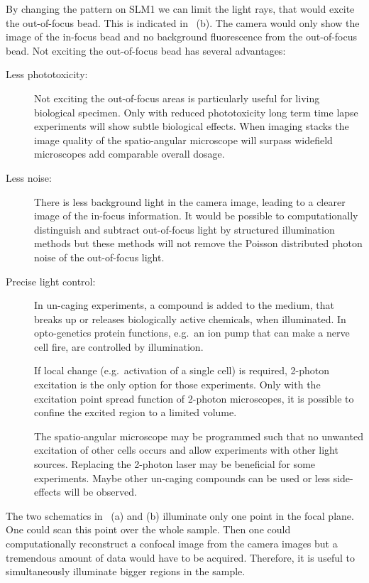 By changing the pattern on SLM1 we can limit the light rays, that
would excite the out-of-focus bead. This is indicated in
~(b). The camera would only show the image
of the in-focus bead and no background fluorescence from the
out-of-focus bead. Not exciting the out-of-focus bead has several
advantages:
\begin{description}
\item[Less phototoxicity:] Not exciting the out-of-focus areas is
  particularly useful for living biological specimen. Only with
  reduced phototoxicity long term time lapse experiments will show
  subtle biological effects. When imaging stacks the image quality of
  the spatio-angular microscope will surpass widefield microscopes add
  comparable overall dosage.
\item[Less noise:] There is less background light in the camera image,
  leading to a clearer image of the in-focus information. It would be
  possible to computationally distinguish and subtract out-of-focus
  light by structured illumination methods but these methods will not
  remove the Poisson distributed photon noise of the out-of-focus
  light.
\item[Precise light control:] In un-caging experiments, a compound is
  added to the medium, that breaks up or releases biologically active
  chemicals, when illuminated. In opto-genetics protein functions,
  e.g.\ an ion pump that can make a nerve cell fire, are controlled by
  illumination.

  If local change (e.g.\ activation of a single cell) is required,
  2-photon excitation is the only option for those experiments. Only
  with the excitation point spread function of 2-photon microscopes,
  it is possible to confine the excited region to a limited volume.

  The spatio-angular microscope may be programmed such that no
  unwanted excitation of other cells occurs and allow experiments with
  other light sources. Replacing the 2-photon laser may be beneficial
  for some experiments. Maybe other un-caging compounds can be used or
  less side-effects will be observed.
\end{description}

The two schematics in ~(a) and (b)
illuminate only one point in the focal plane. One could scan this
point over the whole sample. Then one could computationally
reconstruct a confocal image from the camera images but a tremendous
amount of data would have to be acquired. Therefore, it is useful to
simultaneously illuminate bigger regions in the sample.

